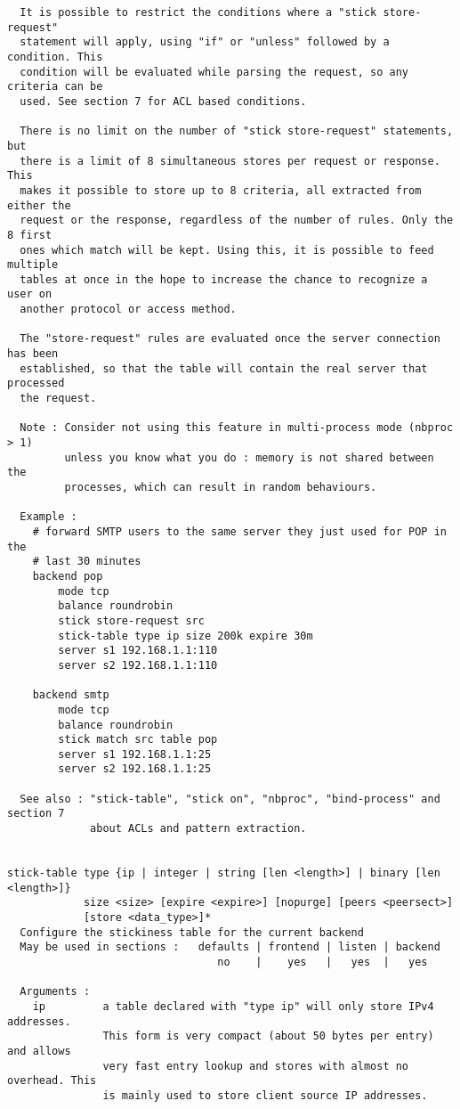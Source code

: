 \begin{verbatim}
  It is possible to restrict the conditions where a "stick store-request"
  statement will apply, using "if" or "unless" followed by a condition. This
  condition will be evaluated while parsing the request, so any criteria can be
  used. See section 7 for ACL based conditions.

  There is no limit on the number of "stick store-request" statements, but
  there is a limit of 8 simultaneous stores per request or response. This
  makes it possible to store up to 8 criteria, all extracted from either the
  request or the response, regardless of the number of rules. Only the 8 first
  ones which match will be kept. Using this, it is possible to feed multiple
  tables at once in the hope to increase the chance to recognize a user on
  another protocol or access method.

  The "store-request" rules are evaluated once the server connection has been
  established, so that the table will contain the real server that processed
  the request.

  Note : Consider not using this feature in multi-process mode (nbproc > 1)
         unless you know what you do : memory is not shared between the
         processes, which can result in random behaviours.

  Example :
    # forward SMTP users to the same server they just used for POP in the
    # last 30 minutes
    backend pop
        mode tcp
        balance roundrobin
        stick store-request src
        stick-table type ip size 200k expire 30m
        server s1 192.168.1.1:110
        server s2 192.168.1.1:110

    backend smtp
        mode tcp
        balance roundrobin
        stick match src table pop
        server s1 192.168.1.1:25
        server s2 192.168.1.1:25

  See also : "stick-table", "stick on", "nbproc", "bind-process" and section 7
             about ACLs and pattern extraction.


stick-table type {ip | integer | string [len <length>] | binary [len <length>]}
            size <size> [expire <expire>] [nopurge] [peers <peersect>]
            [store <data_type>]*
  Configure the stickiness table for the current backend
  May be used in sections :   defaults | frontend | listen | backend
                                 no    |    yes   |   yes  |   yes

  Arguments :
    ip         a table declared with "type ip" will only store IPv4 addresses.
               This form is very compact (about 50 bytes per entry) and allows
               very fast entry lookup and stores with almost no overhead. This
               is mainly used to store client source IP addresses.


\end{verbatim}
